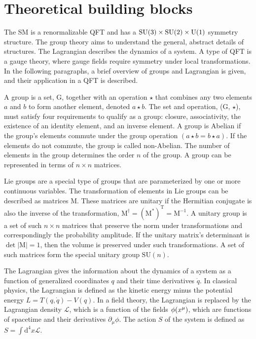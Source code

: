 \section{Theoretical building blocks}
The SM is a renormalizable QFT and has a $\text{SU}(3) \times \text{SU}(2) \times \text{U}(1)$ symmetry structure. The group theory aims to understand the general, abstract details of structures. The Lagrangian describes the dynamics of a system. A type of QFT is a gauge theory, where gauge fields require symmetry under local transformations. In the following paragraphs, a brief overview of groups and Lagrangian is given, and their application in a QFT is described.

A group is a set, G, together with an operation $\star$ that combines any two elements $a$ and $b$ to form another element, denoted $a \star b$. The set and operation, (G, $\star$), must satisfy four requirements to qualify as a group: closure, associativity, the existence of an identity element, and an inverse element. A group is Abelian if the group's elements commute under the group operation $(a \star b = b \star a)$. If the elements do not commute, the group is called non-Abelian. The number of elements in the group determines the order $n$ of the group. A group can be represented in terms of $n \times n$ matrices.

Lie groups are a special type of groups that are parameterized by one or more continuous variables. The transformation of elements in Lie groups can be described as matrices M. These matrices are unitary if the Hermitian conjugate is also the inverse of the transformation, $\text{M}^{\dagger}=(\text{M}^{*})^{\text{T}}=\text{M}^{-1}$. A unitary group is a set of such $n \times n$ matrices that preserve the norm under transformations and correspondingly the probability amplitude. If the unitary matrix's determinant is $\operatorname{det}|\text{M}|=1$, then the volume is preserved under such transformations. A set of such matrices form the special unitary group $\text{SU}(n)$.

The Lagrangian gives the information about the dynamics of a system as a function of generalized coordinates $q$ and their time derivatives $\dot{q}$. In classical physics, the Lagrangian is defined as the kinetic energy minus the potential energy $L=T(q, \dot{q})-V(q)$. In a field theory, the Lagrangian is replaced by the Lagrangian density $\mathcal{L}$, which is a function of the fields $\phi(x^{\mu})$, which are functions of spacetime and their derivatives $\partial_{\mu} \phi$. The action $S$ of the system is defined as $S=\int \text{d}^{4} x \mathcal{L}$.

